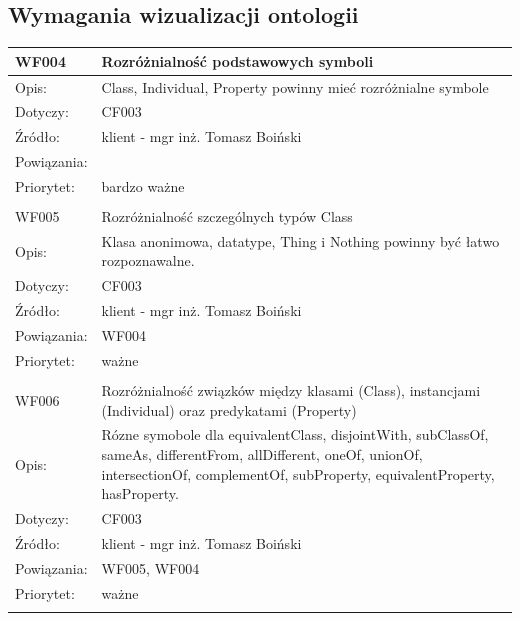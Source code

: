 \documentclass[a4paper,10pt]{article}
\begin{document}
\subsection{Wymagania wizualizacji ontologii}

\begin{center}
\begin{tabular}{|m{3cm}|m{9cm}|} \hline

WF004 & Rozróżnialność podstawowych symboli  \\ \hline
Opis: &  Class, Individual, Property powinny mieć rozróżnialne symbole   \\ \hline
Dotyczy: &  CF003 \\ \hline
Źródło: &  klient - mgr inż. Tomasz Boiński\\ \hline
Powiązania: & \\ \hline
Priorytet: & bardzo ważne \\ \hline

\multicolumn{2}{c}{} \\
 \hline

WF005 &   Rozróżnialność szczególnych typów Class\\ \hline
Opis: &   Klasa anonimowa, datatype, Thing i Nothing powinny być łatwo rozpoznawalne.  \\ \hline
Dotyczy: &  CF003 \\ \hline
Źródło: &  klient - mgr inż. Tomasz Boiński\\ \hline
Powiązania: & WF004 \\ \hline
Priorytet: &  ważne \\ \hline

\multicolumn{2}{c}{} \\
 \hline

WF006 &  Rozróżnialność związków między klasami (Class), instancjami (Individual) oraz predykatami (Property)\\ \hline
Opis: & Rózne symobole dla equivalentClass, disjointWith, subClassOf, sameAs, differentFrom, allDifferent, oneOf, unionOf, intersectionOf, complementOf, subProperty, equivalentProperty, hasProperty.   \\ \hline
Dotyczy: &  CF003\\ \hline
Źródło: &  klient - mgr inż. Tomasz Boiński \\ \hline
Powiązania: & WF005, WF004 \\ \hline
Priorytet: & ważne \\ \hline

\multicolumn{2}{c}{} \\
 \hline


\end{tabular}
\end{center}
\end{document}
